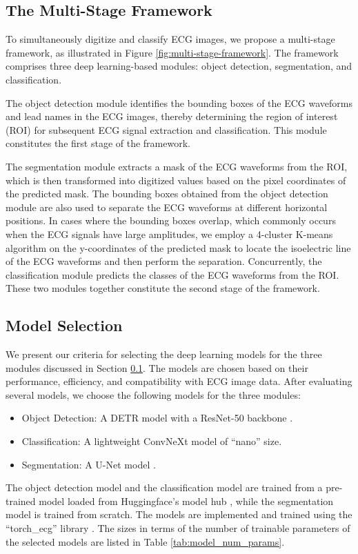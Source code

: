 \subsection{The Multi-Stage Framework}
\label{subsec:multi_stage_framework}


To simultaneously digitize and classify ECG images, we propose a multi-stage framework, as illustrated in Figure \ref{fig:multi-stage-framework}. The framework comprises three deep learning-based modules: object detection, segmentation, and classification.

The object detection module identifies the bounding boxes of the ECG waveforms and lead names in the ECG images, thereby determining the region of interest (ROI) for subsequent ECG signal extraction and classification. This module constitutes the first stage of the framework.

The segmentation module extracts a mask of the ECG waveforms from the ROI, which is then transformed into digitized values based on the pixel coordinates of the predicted mask. The bounding boxes obtained from the object detection module are also used to separate the ECG waveforms at different horizontal positions. In cases where the bounding boxes overlap, which commonly occurs when the ECG signals have large amplitudes, we employ a 4-cluster K-means algorithm on the y-coordinates of the predicted mask to locate the isoelectric line of the ECG waveforms and then perform the separation. Concurrently, the classification module predicts the classes of the ECG waveforms from the ROI. These two modules together constitute the second stage of the framework.

\subsection{Model Selection}
\label{subsec:model_selection}


We present our criteria for selecting the deep learning models for the three modules discussed in Section \ref{subsec:multi_stage_framework}. The models are chosen based on their performance, efficiency, and compatibility with ECG image data. After evaluating several models, we choose the following models for the three modules:
\begin{itemize}
\item[(1)] Object Detection: A DETR model \cite{carion2020DETR} with a ResNet-50 backbone \cite{resnet}.
\item[(2)] Classification: A lightweight ConvNeXt model \cite{Liu_2022_ConvNeXt} of ``nano'' size.
\item[(3)] Segmentation: A U-Net model \cite{unet}.
\end{itemize}
The object detection model and the classification model are trained from a pre-trained model loaded from Huggingface's model hub \cite{wolf-etal-2020-transformers}, while the segmentation model is trained from scratch. The models are implemented and trained using the ``torch\_ecg'' library \cite{torch_ecg_paper}. The sizes in terms of the number of trainable parameters of the selected models are listed in Table \ref{tab:model_num_params}.


